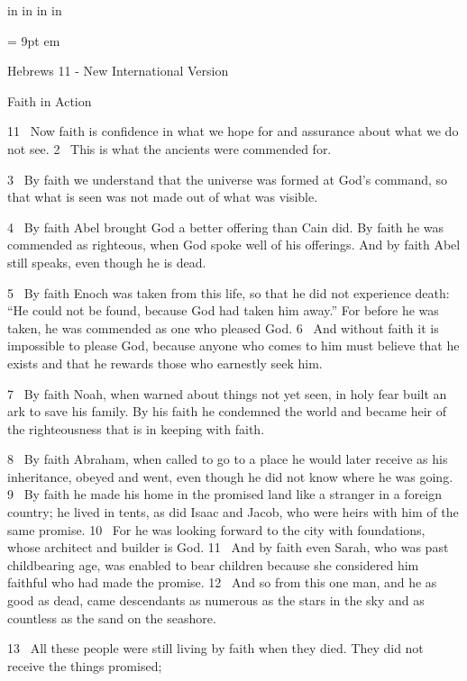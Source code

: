 

 in     %
 in    %
 in  %
 in  %

\FFrf \baselineskip = 9pt
 em


\centerline{  \FFbf
Hebrews 11 - New International Version }

\par
Faith in Action
\par
11 
Now faith is confidence in what we hope for
and assurance about what we do not see.
2 
This is what the ancients were commended for.
\par
3 
By faith we understand that the universe was formed at God’s command,
so that what is seen was not made out of what was visible.
\par
4 
By faith Abel brought God a better offering than Cain did. By faith he was commended
as righteous, when God spoke well of his offerings.
And by faith Abel still speaks, even though he is dead.
\par
5 
By faith Enoch was taken from this life, so that he did not experience death: “He could not be found, because God had taken him away.”
For before he was taken, he was commended as one who pleased God.
6 
And without faith it is impossible to please God, because anyone who comes to him
must believe that he exists and that he rewards those who earnestly seek him.
\par
7 
By faith Noah, when warned about things not yet seen,
in holy fear built an ark
to save his family.
By his faith he condemned the world and became heir of the righteousness that is in keeping with faith.
\par
8 
By faith Abraham, when called to go to a place he would later receive as his inheritance,
obeyed and went,
even though he did not know where he was going.
9 
By faith he made his home in the promised land
like a stranger in a foreign country; he lived in tents,
as did Isaac and Jacob, who were heirs with him of the same promise.
10 
For he was looking forward to the city
with foundations,
whose architect and builder is God.
11 
And by faith even Sarah, who was past childbearing age,
was enabled to bear children
because she
considered him faithful
who had made the promise.
12 
And so from this one man, and he as good as dead,
came descendants as numerous as the stars in the sky and as countless as the sand on the seashore.
\par
13 
All these people were still living by faith when they died. They did not receive the things promised;
